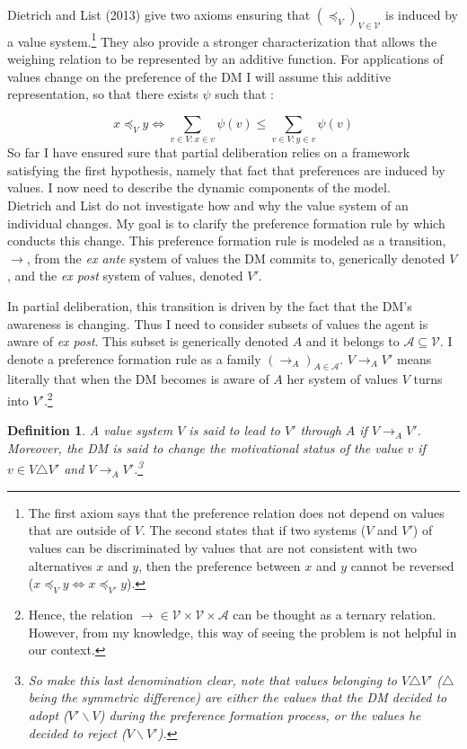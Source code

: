 \documentclass[11pt]{article}
\newtheorem{definition}{Definition}
\begin{document}
\vspace{0,5cm}


Dietrich and List (2013) give two axioms ensuring that $(\preceq_V)_{V\in\mathcal{V}}$ is induced by a value system.\footnote{The first axiom says that the preference relation does not depend on values that are outside of $V$. The second states that if two systems ($V$ and $V'$) of values can be discriminated by values that are not consistent with two alternatives $x$ and $y$, then the preference between $x$ and $y$ cannot be reversed ($x\preceq_V y\iff x\preceq_{V'} y$).} They also provide a stronger characterization that allows the weighing relation to be represented by an additive function. For applications of values change on the preference of the DM I will assume this additive representation, so that there exists $\psi$ such that :

\[
x\preceq_{V} y \iff \displaystyle \sum_{v\in V: x\in v}\psi(v)\leq \displaystyle \sum_{v\in V: y\in v}\psi(v)
\]
So far I have ensured sure that partial deliberation relies on a framework satisfying the first hypothesis, namely that fact that preferences are induced by values. I now need to describe the dynamic components of the model.
\\


Dietrich and List do not investigate how and why the value system of an individual changes. My goal is to clarify the preference formation rule by which conducts this change. This preference formation rule is modeled as a transition, $\rightarrow$, from the \textit{ex ante} system of values the DM commits to, generically denoted $V$, and the \textit{ex post} system of values, denoted $V'$. 



In partial deliberation, this transition is driven by the fact that the DM's awareness is changing. Thus I need to consider subsets of values the agent is aware of \textit{ex post}. This subset is generically denoted $A$ and it belongs to $\mathcal{A}\subseteq \mathcal{V}$. I denote a preference formation rule as a family $(\rightarrow_{A})_{A\in\mathcal{A}}$. $V\rightarrow_{A}V'$ means literally that when the DM becomes is aware of $A$ her system of values $V$ turns into $V'$.\footnote{Hence, the relation $\rightarrow\in \mathcal{V}\times \mathcal{V}\times \mathcal{A}$ can be thought as a ternary relation.  However, from my knowledge, this way of seeing the problem is not helpful in our context.}

\begin{definition}
A value system $V$ is said to lead to $V'$ through $A$ if $V  \rightarrow_A V'$.
Moreover, the DM is said to change the motivational status of the value $v$ if $v\in V\triangle V'$ and $V  \rightarrow_A V'$.\footnote{So make this last denomination clear, note that values belonging to $V\triangle V'$ ($\triangle$ being the symmetric difference) are either the values that the DM decided to adopt ($V'\backslash V$) during the preference formation process, or the values he decided to reject ($V\backslash V'$).}  
\end{definition}
  
\end{document}
